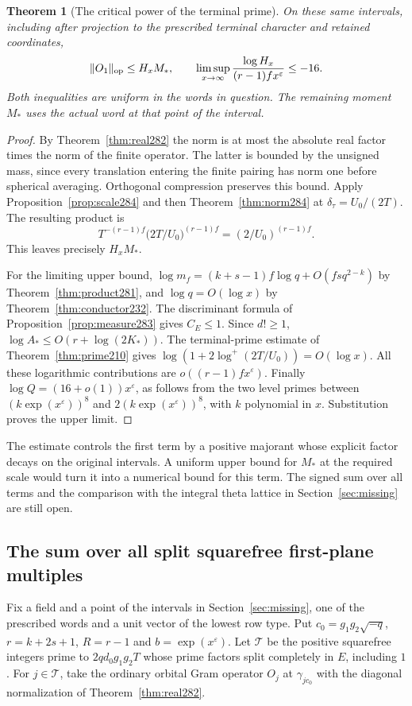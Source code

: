 \documentclass[a4paper,11pt]{article}
\newtheorem{theorem}[proposition]{Theorem}
\theoremstyle{definition}
\theoremstyle{remark}
\numberwithin{equation}{section}
\begin{document}
\begin{theorem}[The critical power of the terminal prime]\leavevmode
\label{thm:first284}
On these same intervals, including after projection to the
prescribed terminal character and retained coordinates,
\[
 \|O_1\|_{\rm op}\le H_x M_*,
 \qquad
 \limsup_{x\to\infty}
        \frac{\log H_x}{(r-1)f x^\varepsilon}\le -16 .
\]
Both inequalities are uniform in the words in question.
The remaining moment \(M_*\) uses the actual word at that
point of the interval.
\end{theorem}
\begin{proof}
By Theorem~\ref{thm:real282} the norm is at most the
absolute real factor times the norm of the finite operator.
The latter is bounded by the unsigned mass, since every
translation entering the finite pairing has norm one before
spherical averaging. Orthogonal compression preserves this
bound. Apply Proposition~\ref{prop:scale284} and then
Theorem~\ref{thm:norm284} at
\(\delta_\tau=U_0/(2T)\). The resulting product is
\[
       T^{-(r-1)f}\bigl(2T/U_0\bigr)^{(r-1)f}
                  =(2/U_0)^{(r-1)f}.
\]
This leaves precisely \(H_xM_*\).

For the limiting upper bound,
\(\log m_f=(k+s-1)f\log q+O(fs q^{2-k})\) by
Theorem~\ref{thm:product281}, and
\(\log q=O(\log x)\) by Theorem~\ref{thm:conductor232}.
The discriminant formula of Proposition~\ref{prop:measure283}
gives \(C_E\le1\). Since \(d!\ge1\),
\(\log A_*\le O(r+\log(2K_*))\).
The terminal-prime estimate of
Theorem~\ref{thm:prime210} gives
\(\log(1+2\log^+(2T/U_0))=O(\log x)\).
All these logarithmic contributions are
\(o((r-1)f x^\varepsilon)\). Finally
\(\log Q=(16+o(1))x^\varepsilon\), as follows from the
two level primes between \((k\exp(x^\varepsilon))^8\)
and \(2(k\exp(x^\varepsilon))^8\), with \(k\) polynomial
in \(x\). Substitution proves the upper limit.
\end{proof}

The estimate controls the first term by a positive majorant
whose explicit factor decays on the original intervals.
A uniform upper bound for \(M_*\) at the required scale
would turn it into a numerical bound for this term.
The signed sum over all terms and the comparison with the
integral theta lattice in Section~\ref{sec:missing} are still open.

\subsection{The sum over all split squarefree first-plane multiples}\label{nav:IX-52}
Fix a field and a point of the intervals in Section~\ref{sec:missing}, one
of the prescribed words and a unit vector of the lowest row
type. Put \(c_0=g_1g_2\sqrt{-q}\), \(r=k+2s+1\),
\(R=r-1\) and \(b=\exp(x^\varepsilon)\). Let \(\mathcal T\)
be the positive squarefree integers prime to \(2qd_0g_1g_2T\)
whose prime factors split completely in \(E\), including \(1\).
For \(j\in\mathcal T\), take the ordinary orbital Gram operator
\(O_j\) at \(\gamma_{j c_0}\) with the diagonal normalization
of Theorem~\ref{thm:real282}.
\end{document}
